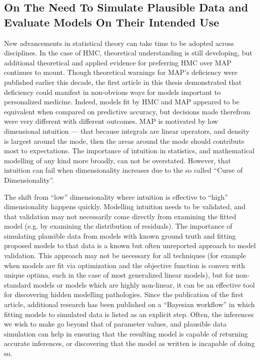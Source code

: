 \subsection{On The Need To Simulate Plausible Data and Evaluate Models On Their Intended Use}
New advancements in statistical theory can take time to be adopted across disciplines. In the case of HMC, theoretical understanding is still developing, but additional theoretical and applied evidence for preferring HMC over MAP continues to mount.  Though theoretical warnings for MAP's deficiency were published earlier this decade, the first article in this thesis demonstrated that deficiency could manifest in non-obvious ways for models important to personalized medicine.  Indeed, models fit by HMC and MAP appeared to be equivalent when compared on predictive accuracy, but decisions made therefrom were very different with different outcomes.  MAP is motivated by low dimensional intuition --- that because integrals are linear operators, and density is largest around the mode, then the areas around the mode should contribute most to expectations.  The importance of intuition in statistics, and mathematical modelling of any kind more broadly, can not be overstated.  However, that intuition can fail when dimensionality increases due to the so called ``Curse of Dimensionality''.

The shift from ``low'' dimensionality where intuition is effective to ``high'' dimensionality happens quickly. Modelling intuition needs to be validated, and that validation may not necessarily come directly from examining the fitted model (e.g. by examining the distribution of residuals).  The importance of simulating plausible data from models with known ground truth and fitting proposed models to that data is a known but often unreported approach to model validation.  This approach may not be necessary for all techniques (for example when models are fit via optimization and the objective function is convex with unique optima, such in the case of most generalized linear models), but for non-standard models or models which are highly non-linear, it can be an effective tool for discovering hidden modelling pathologies.  Since the publication of the first article, additional research has been published on a ``Bayesian workflow''  \cite{gelman_bayesian_2020} in which fitting models to simulated data is listed as an explicit step.  Often, the inferences we wish to make go beyond that of parameter values, and plausible data simulation can help in ensuring that the resulting model is capable of returning accurate inferences, or discovering that the model as written is incapable of doing so.

